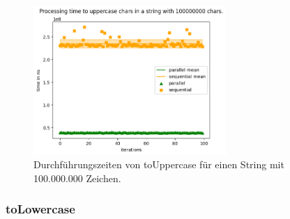 \documentclass[plainarticle,zihtitle,german,final,hyperref,utf8]{zihpub}
\begin{document}
\begin{figure}[h]
\begin{center}
	\includegraphics[width=0.65\textwidth]{images/comp_upper_100000000.png}
	\caption{Durchführungszeiten von toUppercase für einen String mit 100.000.000 Zeichen.}
\end{center}
\end{figure}

\clearpage
\subsubsection{toLowercase}
\end{document}
